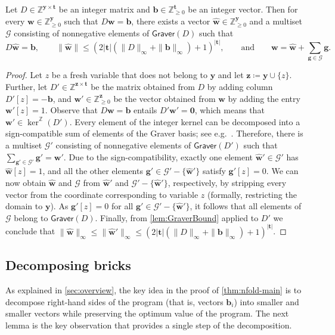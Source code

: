 \documentclass{article}
\renewcommand{\leq}{\leqslant}
\renewcommand{\geq}{\geqslant}
\newcommand{\Z}{\mathbb{Z}}
\newcommand{\Zn}{\Z_{\geq 0}}
\newcommand{\tup}[1]{{\mathbf{#1}}}
\newcommand{\ww}{\tup w}
\newcommand{\whww}{{\widehat{\ww}}}
\newcommand{\yy}{\tup y}
\newcommand{\zz}{\tup z}
\newcommand{\tv}{\tup t}
\newcommand{\bb}{\tup b}
\renewcommand{\gg}{\tup g}
\newcommand{\matrices}[3]{#1^{#2\times #3}}
\newcommand{\Graver}{\mathsf{Graver}}
\newcommand{\Gg}{\mathcal{G}}
\renewcommand{\setminus}{-}
\begin{document}
\begin{lemma}\label{lem:GraverDecomp}
Let $D \in \matrices{\Z}{\yy}{\tv}$ be an integer matrix and $\bb \in \Zn^{\tv}$ be an integer vector. Then for every $\ww\in \Zn^{\yy}$ such that $D\ww=\bb$, there exists a vector $\whww\in \Zn^{\yy}$ and a multiset $\Gg$ consisting of nonnegative elements of $\Graver(D)$ such that $$D\whww=\bb, \qquad\|\whww\|\leq (2|\tv|(\|D\|_\infty+\|\bb\|_\infty)+1)^{|\tv|},\qquad \textrm{and}\qquad \ww=\whww+\sum_{\gg\in \Gg} \gg.$$
\end{lemma}
\begin{proof}
Let $z$ be a fresh variable that does not belong to $\yy$ and let $\zz\coloneqq \yy\cup \{z\}$. Further, let $D'\in \matrices{\Z}{\zz}{\tv}$ be the matrix obtained from $D$ by adding column $D'[z]=-\bb$, and $\ww'\in \Zn^{\zz}$ be the vector obtained from $\ww$ by adding the entry $\ww'[z]=1$. Observe that $D\ww=\bb$ entails $D'\ww'=\mathbf{0}$, which means that $\ww'\in \ker^\Z(D')$. Every element of the integer kernel can be decomposed into a sign-compatible sum of elements of the Graver basis; see e.g.~\cite[Lemma~3.2.3]{JesusBook}. Therefore, there is a multiset $\Gg'$ consisting of nonnegative elements of $\Graver(D')$ such that $\sum_{\gg'\in \Gg'}\gg'=\ww'$.
Due to the sign-compatibility, exactly one element $\whww' \in \Gg'$ has $\whww[z]=1$, and all the other elements $\gg'\in \Gg'\setminus \{\whww'\}$ satisfy $\gg'[z]=0$. We can now obtain $\whww$ and $\Gg$ from $\whww'$ and $\Gg'\setminus \{\whww'\}$, respectively, by stripping every vector from the coordinate corresponding to variable $z$ (formally, restricting the domain to $\yy$). As $\gg'[z]=0$ for all $\gg'\in \Gg'\setminus \{\whww'\}$, it follows that all elements of $\Gg$ belong to $\Graver(D)$. Finally, from \cref{lem:GraverBound} applied to $D'$ we conclude that $\|\whww\|_\infty\leq \|\whww'\|_\infty\leq (2|\tv|(\|D\|_\infty+\|\bb\|_\infty)+1)^{|\tv|}$.
\end{proof}

\subsection{Decomposing bricks}

As explained in \cref{sec:overview}, the key idea in the proof of \cref{thm:nfold-main} is to decompose right-hand sides of the program (that is, vectors $\bb_i$) into smaller and smaller vectors while preserving the optimum value of the program. The next lemma is the key observation that provides a single step of the decomposition.
\end{document}
